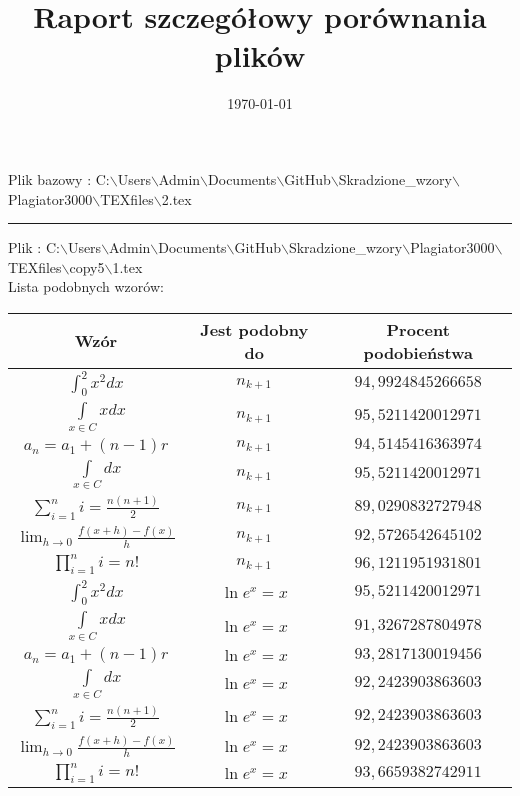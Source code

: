 \documentclass{article}
\begin{document}
\title{\huge\bfseries Raport szczegółowy porównania plików }
\date{\today}
\maketitle
\begin{flushleft}
Plik bazowy : C:$\backslash$Users$\backslash$Admin$\backslash$Documents$\backslash$GitHub$\backslash$Skradzione\_wzory$\backslash$Plagiator3000$\backslash$TEXfiles$\backslash$2.tex
\end{flushleft}
\hrule
\begin{flushleft}
Plik : C:$\backslash$Users$\backslash$Admin$\backslash$Documents$\backslash$GitHub$\backslash$Skradzione\_wzory$\backslash$Plagiator3000$\backslash$TEXfiles$\backslash$copy5$\backslash$1.tex\\ 
Lista podobnych wzorów: \\ 
\begin{longtable}{|c|c|c|} 
 \hline 
 Wzór & Jest podobny do & Procent podobieństwa \\ \hline  
$\int _0^2x^2dx$ & $n_{k+1}$ & $94,9924845266658$ \\ \hline 
$\int \limits_{x\in C}xdx$ & $n_{k+1}$ & $95,5211420012971$ \\ \hline 
$a_{n}=a_{1}+(n-1)r$ & $n_{k+1}$ & $94,5145416363974$ \\ \hline 
$\int \limits_{x\in C}dx$ & $n_{k+1}$ & $95,5211420012971$ \\ \hline 
$\sum_{i=1}^{n}i=\frac{n(n+1)}{2}$ & $n_{k+1}$ & $89,0290832727948$ \\ \hline 
$\lim_{h\to0}\frac{f(x+h)-f(x)}{h}$ & $n_{k+1}$ & $92,5726542645102$ \\ \hline 
$\prod_{i=1}^ni=n!$ & $n_{k+1}$ & $96,1211951931801$ \\ \hline 
$\int _0^2x^2dx$ & $\ln e^x=x$ & $95,5211420012971$ \\ \hline 
$\int \limits_{x\in C}xdx$ & $\ln e^x=x$ & $91,3267287804978$ \\ \hline 
$a_{n}=a_{1}+(n-1)r$ & $\ln e^x=x$ & $93,2817130019456$ \\ \hline 
$\int \limits_{x\in C}dx$ & $\ln e^x=x$ & $92,2423903863603$ \\ \hline 
$\sum_{i=1}^{n}i=\frac{n(n+1)}{2}$ & $\ln e^x=x$ & $92,2423903863603$ \\ \hline 
$\lim_{h\to0}\frac{f(x+h)-f(x)}{h}$ & $\ln e^x=x$ & $92,2423903863603$ \\ \hline 
$\prod_{i=1}^ni=n!$ & $\ln e^x=x$ & $93,6659382742911$ \\ \hline 

\end{longtable}
\end{flushleft}
\end{document}
